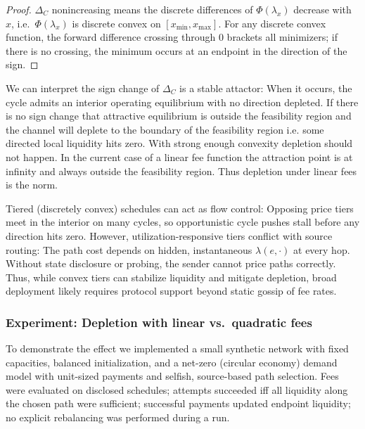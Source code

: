 \documentclass[10pt,twocolumn]{article}
\begin{document}
\begin{proof}
$\Delta_C$ nonincreasing means the discrete differences of $\Phi(\lambda_x)$ decrease with $x$, i.e.\ $\Phi(\lambda_x)$ is discrete convex on $[x_{\min},x_{\max}]$.
For any discrete convex function, the forward difference crossing through $0$ brackets all minimizers; if there is no crossing, the minimum occurs at an endpoint in the direction of the sign.
\end{proof}

We can interpret the sign change of $\Delta_C$ is a stable attactor: When it occurs, the cycle admits an interior operating equilibrium with no direction depleted. If there is no sign change that attractive equilibrium is outside the feasibility region and the channel will deplete to the boundary of the feasibility region i.e. some directed local liquidity hits zero. With strong enough convexity depletion should not happen. In the current case of a linear fee function the attraction point is at infinity and always outside the feasibility region. Thus depletion under linear fees is the norm.

Tiered (discretely convex) schedules can act as flow control: Opposing price tiers meet in the interior on many cycles, so opportunistic cycle pushes stall before any direction hits zero. However, utilization-responsive tiers conflict with source routing: The path cost depends on hidden, instantaneous $\lambda(e,\cdot)$ at every hop. Without state disclosure or probing, the sender cannot price paths correctly. Thus, while convex tiers can stabilize liquidity and mitigate depletion, broad deployment likely requires protocol support beyond static gossip of fee rates.


\subsubsection{Experiment: Depletion with linear vs.\ quadratic fees}
\label{subsubsec:exp-convex-vs-linear}

To demonstrate the effect we implemented a small synthetic network with fixed capacities, balanced initialization, and a net-zero (circular economy) demand model with unit-sized payments and selfish, source-based path selection. Fees were evaluated on disclosed schedules; attempts succeeded iff all liquidity along the chosen path were sufficient; successful payments updated endpoint liquidity; no explicit rebalancing was performed during a run.
\end{document}
